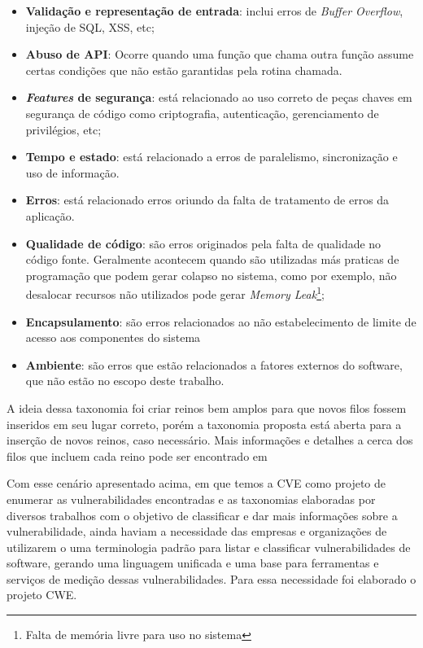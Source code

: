 \begin{itemize}
\item \textbf{Validação e representação de entrada}: inclui erros de \emph{Buffer Overflow}, injeção de SQL, XSS, etc;
\item \textbf{Abuso de API}: Ocorre quando uma função que chama outra função assume certas condições que não estão garantidas pela rotina chamada.
\item \textbf{\emph{Features} de segurança}: está relacionado ao uso correto de peças chaves em segurança de código como criptografia, autenticação, gerenciamento de privilégios, etc;
\item \textbf{Tempo e estado}: está relacionado a erros de paralelismo, sincronização e uso de informação.
\item \textbf{Erros}: está relacionado erros oriundo da falta de tratamento de erros da aplicação.
\item \textbf{Qualidade de código}: são erros originados pela falta de qualidade no código fonte. Geralmente acontecem quando são utilizadas más praticas de programação que podem gerar colapso no sistema, como por exemplo, não desalocar recursos não utilizados pode gerar \emph{Memory Leak}\footnote{Falta de memória livre para uso no sistema};
\item \textbf{Encapsulamento}: são erros relacionados ao não estabelecimento de limite de acesso aos componentes do sistema
\item \textbf{Ambiente}: são erros que estão relacionados a fatores externos do software, que não estão no escopo deste trabalho.

\end{itemize}

A ideia dessa taxonomia foi criar reinos bem amplos para que novos filos fossem inseridos em seu lugar correto, porém a taxonomia proposta está aberta para a inserção de novos reinos, caso necessário. Mais informações e detalhes a cerca dos filos que incluem cada reino pode ser encontrado em \cite{tsipenyuk2005}

%
Com esse cenário apresentado acima, em que temos a CVE como projeto de enumerar as vulnerabilidades encontradas e as taxonomias elaboradas por diversos trabalhos com o objetivo de classificar e dar mais informações sobre a vulnerabilidade, ainda haviam a necessidade das empresas e organizações de utilizarem o uma terminologia padrão para listar e classificar vulnerabilidades de software, gerando uma linguagem unificada e uma base para ferramentas e serviços de medição dessas vulnerabilidades. Para essa necessidade foi elaborado o projeto CWE.

